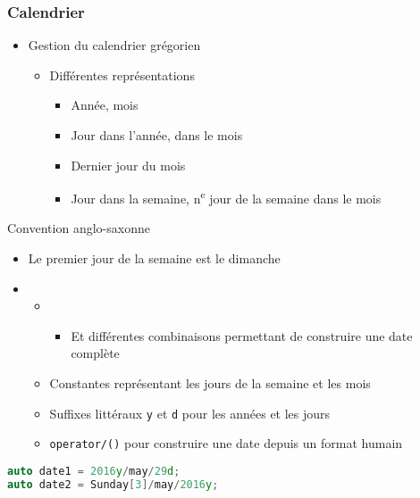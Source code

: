 \documentclass[C++.tex]{subfiles}
\begin{document}
\begin{frame}[fragile]
	\frametitle{Calendrier}
	\begin{itemize}
		\item Gestion du calendrier grégorien
		\begin{itemize}
			\item Différentes représentations
			\begin{itemize}
				\item Année, mois
				\item Jour dans l'année, dans le mois
				\item Dernier jour du mois
				\item Jour dans la semaine, n\textsuperscript{e} jour de la semaine dans le mois
			\end{itemize}
		\end{itemize}
	\end{itemize}

	\begin{alertblock}{Convention anglo-saxonne}
		\begin{itemize}
			\item Le premier jour de la semaine est le dimanche
		\end{itemize}
	\end{alertblock}

	\begin{itemize}
		\item [] \begin{itemize}
			\item [] \begin{itemize}
				\item Et différentes combinaisons permettant de construire une date complète
			\end{itemize}
			\item Constantes représentant les jours de la semaine et les mois
			\item Suffixes littéraux \lstinline|y| et \lstinline|d| pour les années et les jours
			\item \lstinline|operator/()| pour construire une date depuis un format \og humain\fg{}
		\end{itemize}
	\end{itemize}

	\begin{lstlisting}[language=C++]
auto date1 = 2016y/may/29d;
auto date2 = Sunday[3]/may/2016y;\end{lstlisting}
\end{frame}
\end{document}
